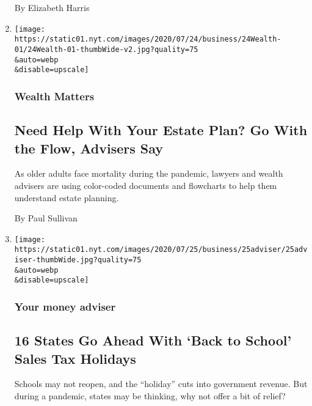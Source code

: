 \begin{enumerate}
  By Elizabeth Harris
\item
  \href{/2020/07/24/your-money/need-help-with-your-estate-plan-go-with-the-flow-advisers-say.html}{}

  \texttt{[image: https://static01.nyt.com/images/2020/07/24/business/24Wealth-01/24Wealth-01-thumbWide-v2.jpg?quality=75\\\&auto=webp\\\&disable=upscale]}

  \hypertarget{wealth-matters-1}{%
  \subsubsection{Wealth Matters}\label{wealth-matters-1}}

  \hypertarget{need-help-with-your-estate-plan-go-with-the-flow-advisers-say}{%
  \subsection{Need Help With Your Estate Plan? Go With the Flow,
  Advisers
  Say}\label{need-help-with-your-estate-plan-go-with-the-flow-advisers-say}}

  As older adults face mortality during the pandemic, lawyers and wealth
  advisers are using color-coded documents and flowcharts to help them
  understand estate planning.

  By Paul Sullivan
\item
  \href{/2020/07/24/your-money/back-to-school-tax-holiday-coronavirus.html}{}

  \texttt{[image: https://static01.nyt.com/images/2020/07/25/business/25adviser/25adviser-thumbWide.jpg?quality=75\\\&auto=webp\\\&disable=upscale]}

  \hypertarget{your-money-adviser}{%
  \subsubsection{Your money adviser}\label{your-money-adviser}}

  \hypertarget{16-states-go-ahead-with-back-to-school-sales-tax-holidays}{%
  \subsection{16 States Go Ahead With `Back to School' Sales Tax
  Holidays}\label{16-states-go-ahead-with-back-to-school-sales-tax-holidays}}

  Schools may not reopen, and the ``holiday'' cuts into government
  revenue. But during a pandemic, states may be thinking, why not offer
  a bit of relief?


\end{enumerate}
